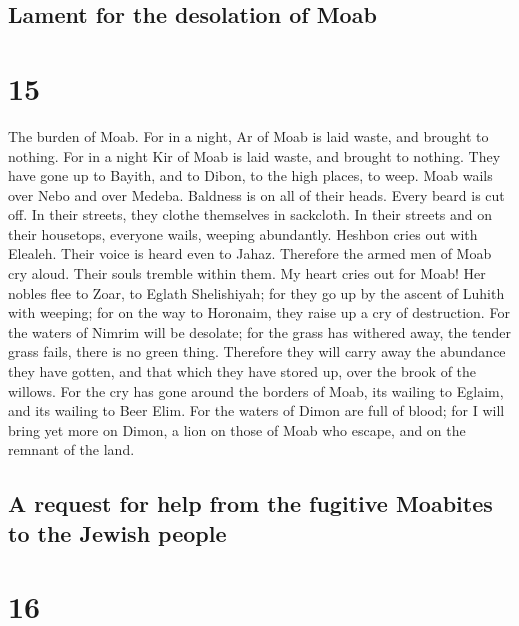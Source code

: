 \hypertarget{lament-for-the-desolation-of-moab}{%
\subsection{Lament for the desolation of
Moab}\label{lament-for-the-desolation-of-moab}}

\hypertarget{section-14}{%
\section{15}\label{section-14}}

 The burden of Moab. For in a night, Ar of Moab is laid
waste, and brought to nothing. For in a night Kir of Moab is laid waste,
and brought to nothing.  They have gone up to Bayith, and
to Dibon, to the high places, to weep. Moab wails over Nebo and over
Medeba. Baldness is on all of their heads. Every beard is cut off.
 In their streets, they clothe themselves in sackcloth. In
their streets and on their housetops, everyone wails, weeping
abundantly.  Heshbon cries out with Elealeh. Their voice
is heard even to Jahaz. Therefore the armed men of Moab cry aloud. Their
souls tremble within them.  My heart cries out for Moab!
Her nobles flee to Zoar, to Eglath Shelishiyah; for they go up by the
ascent of Luhith with weeping; for on the way to Horonaim, they raise up
a cry of destruction.  For the waters of Nimrim will be
desolate; for the grass has withered away, the tender grass fails, there
is no green thing.  Therefore they will carry away the
abundance they have gotten, and that which they have stored up, over the
brook of the willows.  For the cry has gone around the
borders of Moab, its wailing to Eglaim, and its wailing to Beer Elim.
 For the waters of Dimon are full of blood; for I will
bring yet more on Dimon, a lion on those of Moab who escape, and on the
remnant of the land.

\hypertarget{a-request-for-help-from-the-fugitive-moabites-to-the-jewish-people}{%
\subsection{A request for help from the fugitive Moabites to the Jewish
people}\label{a-request-for-help-from-the-fugitive-moabites-to-the-jewish-people}}

\hypertarget{section-15}{%
\section{16}\label{section-15}}


